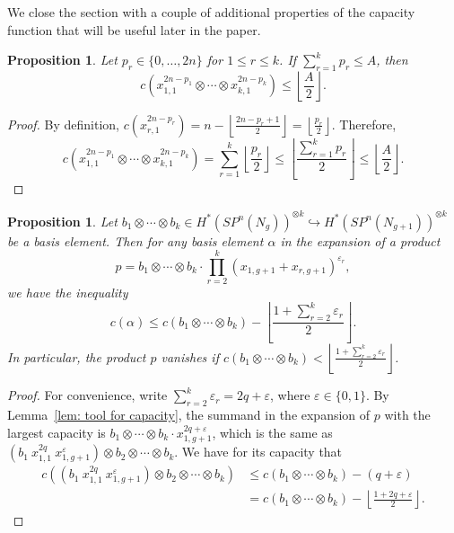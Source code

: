 \documentclass[amscd,amssymb,verbatim,10pt]{amsart}
\numberwithin{equation}{section}
\theoremstyle{plain}
\newtheorem{proposition}[thm]{Proposition}
\theoremstyle{definition}
\begin{document}
We close the section with a couple of additional properties of the capacity function that will be useful later in the paper.

\begin{proposition}\label{prop: prop y from notes}
Let $p_{r}\in\{0,\ldots, 2n\}$ for $1\le r \le k$. If $\sum_{r=1}^kp_r\le A$, then
\[
c\left(x_{1,1}^{2n-p_1}\otimes\cdots\otimes x_{k,1}^{2n-p_k}\right)\le\left\lfloor\frac{A}{2}\right\rfloor.
\]
\end{proposition}
\begin{proof}
By definition, $c(x_{r,1}^{2n-p_r})=n-\left\lfloor\tfrac{2n-p_r+1}{2}\right\rfloor=\left\lfloor\tfrac{p_r}{2}\right\rfloor$. Therefore,
\[
c\left(x_{1,1}^{2n-p_1}\otimes\cdots\otimes x_{k,1}^{2n-p_k}\right)=\sum_{r=1}^k \left\lfloor\frac{p_r}{2}\right\rfloor\le\left\lfloor\frac{\sum_{r=1}^kp_r}{2}\right\rfloor\le\left\lfloor\frac{A}{2}\right\rfloor.
\]
\end{proof}

\begin{proposition}\label{prop: prop z from notes}
Let $b_1\otimes\cdots\otimes b_k\in H^*(SP^n(N_g))^{\otimes k}\hookrightarrow H^*(SP^n(N_{g+1}))^{\otimes k}$ be a basis element. Then for any basis element $\alpha$ in the expansion of a product
\[
p=b_1\otimes\cdots\otimes b_k\cdot\prod_{r=2}^k\left(x_{1,g+1}+x_{r,g+1}\right)^{\varepsilon_r},
\]
we have the inequality
\[
c(\alpha)\le c\left(b_1\otimes\cdots\otimes b_k\right)-\left\lfloor\frac{1+\sum_{r=2}^k\varepsilon_r}{2}\right\rfloor.
\]
In particular, the product $p$ vanishes if $c(b_1\otimes\cdots\otimes b_k)<\left\lfloor\tfrac{1+\sum_{r=2}^k\varepsilon_r}{2}\right\rfloor$.
\end{proposition}

\begin{proof}
For convenience, write $\sum_{r=2}^k\varepsilon_r=2q+\varepsilon$, where $\varepsilon\in\{0,1\}$. By Lemma~\ref{lem: tool for capacity}, the summand in the expansion of $p$ with the largest capacity is $b_1\otimes\cdots\otimes b_k\cdot x_{1,g+1}^{2q+\varepsilon}$, which is the same as $(b_1\ x_{1,1}^{2q}\ x_{1,g+1}^{\varepsilon})\otimes b_2\otimes\cdots\otimes b_k$. We have for its capacity that
\begin{align*}
c\left((b_1 \ x_{1,1}^{2q}\ x_{1,g+1}^{\varepsilon})\otimes b_2\otimes\cdots\otimes b_k\right)
&
\le c\left(b_1\otimes\cdots\otimes b_k\right)-(q+\varepsilon)
\\
&
=c\left(b_1\otimes\cdots\otimes b_k\right)-\left\lfloor\frac{1+2q+\varepsilon}{2}\right\rfloor.
\end{align*}
\end{proof}
\end{document}
